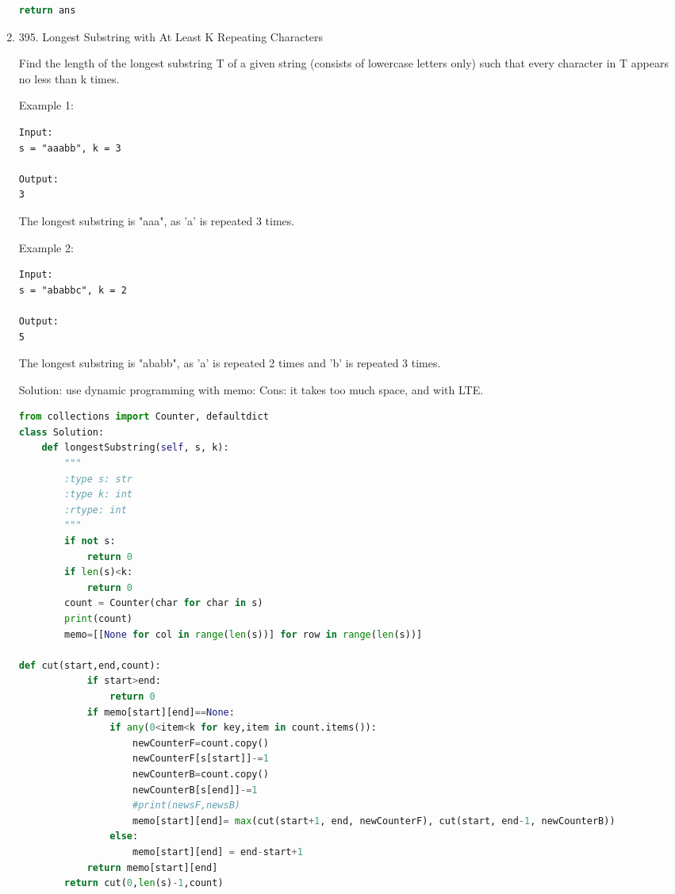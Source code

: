 \documentclass[../main.tex]{subfiles}
\begin{document}
\begin{enumerate}
\begin{lstlisting}[language = Python]
        return ans
\end{lstlisting}

\item 395. Longest Substring with At Least K Repeating Characters

Find the length of the longest substring T of a given string (consists of lowercase letters only) such that every character in T appears no less than k times.

Example 1:
\begin{lstlisting}
Input:
s = "aaabb", k = 3

Output:
3
\end{lstlisting}

The longest substring is "aaa", as 'a' is repeated 3 times.

Example 2:
\begin{lstlisting}
Input:
s = "ababbc", k = 2

Output:
5
\end{lstlisting}

The longest substring is "ababb", as 'a' is repeated 2 times and 'b' is repeated 3 times.

Solution: use dynamic programming with memo: Cons: it takes too much space, and with LTE.
\begin{lstlisting}[language = Python]
from collections import Counter, defaultdict
class Solution:
    def longestSubstring(self, s, k):
        """
        :type s: str
        :type k: int
        :rtype: int
        """
        if not s:
            return 0
        if len(s)<k:
            return 0
        count = Counter(char for char in s)
        print(count)
        memo=[[None for col in range(len(s))] for row in range(len(s))]

def cut(start,end,count):
            if start>end:
                return 0
            if memo[start][end]==None:
                if any(0<item<k for key,item in count.items()):
                    newCounterF=count.copy()
                    newCounterF[s[start]]-=1
                    newCounterB=count.copy()
                    newCounterB[s[end]]-=1
                    #print(newsF,newsB)
                    memo[start][end]= max(cut(start+1, end, newCounterF), cut(start, end-1, newCounterB))
                else:
                    memo[start][end] = end-start+1
            return memo[start][end]
        return cut(0,len(s)-1,count)
\end{lstlisting}


\end{enumerate}
\end{document}
